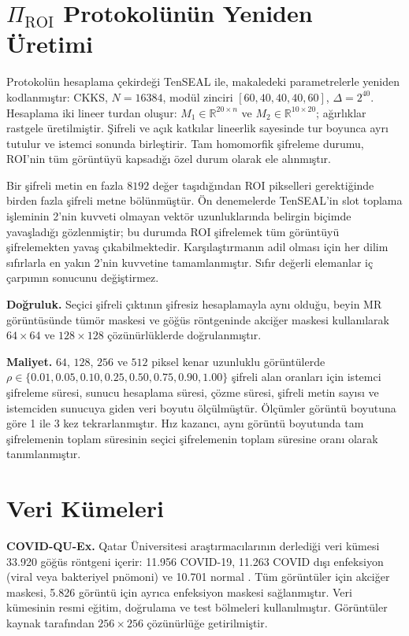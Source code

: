 \section{$\Pi_{\mathrm{ROI}}$ Protokolünün Yeniden Üretimi}\label{sec:reproduction}

Protokolün hesaplama çekirdeği TenSEAL \cite{benaissa2021tenseal} ile, makaledeki parametrelerle yeniden kodlanmıştır: CKKS, $N = 16384$, modül zinciri $[60, 40, 40, 40, 60]$, $\Delta = 2^{40}$. Hesaplama iki lineer turdan oluşur: $M_1 \in \mathbb{R}^{20 \times n}$ ve $M_2 \in \mathbb{R}^{10 \times 20}$; ağırlıklar rastgele üretilmiştir. Şifreli ve açık katkılar lineerlik sayesinde tur boyunca ayrı tutulur ve istemci sonunda birleştirir. Tam homomorfik şifreleme durumu, ROI'nin tüm görüntüyü kapsadığı özel durum olarak ele alınmıştır.

Bir şifreli metin en fazla $8192$ değer taşıdığından ROI pikselleri gerektiğinde birden fazla şifreli metne bölünmüştür. Ön denemelerde TenSEAL'in slot toplama işleminin 2'nin kuvveti olmayan vektör uzunluklarında belirgin biçimde yavaşladığı gözlenmiştir; bu durumda ROI şifrelemek tüm görüntüyü şifrelemekten yavaş çıkabilmektedir. Karşılaştırmanın adil olması için her dilim sıfırlarla en yakın 2'nin kuvvetine tamamlanmıştır. Sıfır değerli elemanlar iç çarpımın sonucunu değiştirmez.

\textbf{Doğruluk.} Seçici şifreli çıktının şifresiz hesaplamayla aynı olduğu, beyin MR görüntüsünde tümör maskesi ve göğüs röntgeninde akciğer maskesi kullanılarak $64 \times 64$ ve $128 \times 128$ çözünürlüklerde doğrulanmıştır.

\textbf{Maliyet.} $64$, $128$, $256$ ve $512$ piksel kenar uzunluklu görüntülerde $\rho \in \{0.01, 0.05, 0.10, 0.25, 0.50, 0.75, 0.90, 1.00\}$ şifreli alan oranları için istemci şifreleme süresi, sunucu hesaplama süresi, çözme süresi, şifreli metin sayısı ve istemciden sunucuya giden veri boyutu ölçülmüştür. Ölçümler görüntü boyutuna göre 1 ile 3 kez tekrarlanmıştır. Hız kazancı, aynı görüntü boyutunda tam şifrelemenin toplam süresinin seçici şifrelemenin toplam süresine oranı olarak tanımlanmıştır.

\section{Veri Kümeleri}\label{sec:data}

\textbf{COVID-QU-Ex.} Qatar Üniversitesi araştırmacılarının derlediği veri kümesi 33.920 göğüs röntgeni içerir: 11.956 COVID-19, 11.263 COVID dışı enfeksiyon (viral veya bakteriyel pnömoni) ve 10.701 normal \cite{tahir2021covidquex}. Tüm görüntüler için akciğer maskesi, 5.826 görüntü için ayrıca enfeksiyon maskesi sağlanmıştır. Veri kümesinin resmi eğitim, doğrulama ve test bölmeleri kullanılmıştır. Görüntüler kaynak tarafından $256 \times 256$ çözünürlüğe getirilmiştir.

